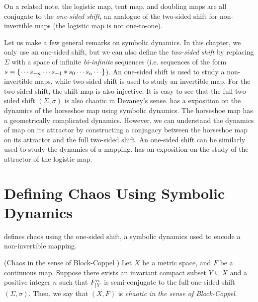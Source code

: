 \documentclass[10pt,twoside]{book}
\begin{document}
On a related note, the logistic map, tent map, and doubling maps are all conjugate to the \textit{one-sided shift}, an analogue of the two-sided shift for non-invertible maps (the logistic map is not one-to-one).

Let us make a few general remarks on symbolic dynamics.
In this chapter, we only use an one-sided shift, but we can also define the \textit{two-sided shift} by replacing $\Sigma$ with a space of infinite \textit{bi-infinite} sequences (i.e. sequences of the form $s = \set{ \cdots s_{-n} \cdots s_{-1} * s_0 \cdots s_n \cdots }$).
An one-sided shift is used to study a non-invertible maps, while two-sided shift is used to study an invertible map.
For the two-sided shift, the shift map is also injective.
It is easy to see that the full two-sided shift $(\Sigma, \sigma)$ is also chaotic in Devaney's sense.
\citet{wiggins} has a exposition on the dynamics of the horseshoe map using symbolic dynamics.
The horseshoe map has a geometrically complicated dynamics.
However, we can understand the dynamics of map on its attractor by constructing a conjugacy between the horseshoe map on its attractor and the full two-sided shift.
An one-sided shift can be similarly used to study the dynamics of a mapping.
\citet{sternberg} has an exposition on the study of the attractor of the logistic map.


\section{Defining Chaos Using Symbolic Dynamics}
\citet{blockcoppel} defines chaos using the one-sided shift, a symbolic dynamics used to encode a non-invertible mapping.
\begin{definition}
  (Chaos in the sense of Block-Coppel \citep{blockcoppel})
  Let $X$ be a metric space, and $F$ be a continuous map.
  Suppose there exists an invariant compact subset $Y \subseteq X$ and a positive integer $n$ such that $F^{n}_{|Y}$ is semi-conjugate to the full one-sided shift $(\Sigma, \sigma)$.
  Then, we say that $(X,F)$ is \textit{chaotic in the sense of Block-Coppel}.
  \begin{center}
  \end{center}
  \label{defn:blockcoppel}
\end{definition}





\printindex
\end{document}

